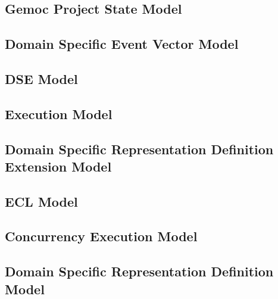 \documentclass{gemoc} %
\begin{document}

\subsection{Gemoc Project State Model}


\subsection{Domain Specific Event Vector Model}


\subsection{DSE Model}


\subsection{Execution Model}


\subsection{Domain Specific Representation Definition Extension Model}


\subsection{ECL Model}


\subsection{Concurrency Execution Model}


\subsection{Domain Specific  Representation Definition Model}
\end{document}
